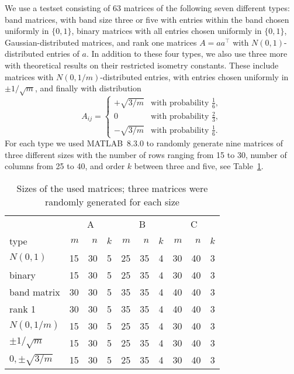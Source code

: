 \documentclass[journal]{IEEEtran}
\newcommand{\T}{^{\top}}
\begin{document}
We use a testset consisting of 63 matrices of the following seven
different types: band matrices,
with band size three or five with entries within the band chosen uniformly in $\{0,1\}$, binary matrices with all entries chosen 
uniformly in $\{0,1\}$, Gaussian-distributed matrices, and rank one 
matrices $A = aa\T$ with $N(0,1)$-distributed entries of $a$. In addition to these four types,
we also use three more with theoretical results on their restricted isometry
constants. These include matrices with 
$N(0, 1/m)$-distributed entries, with entries chosen uniformly in $\pm 1/\sqrt{m}$, and finally with distribution
\begin{equation}\nonumber
  A_{ij} = \begin{cases}
    + \sqrt{3/m} & \text{with probability } \frac{1}{6}, \\
    0 & \text{with probability } \frac{2}{3}, \\
    - \sqrt{3/m} & \text{with probability } \frac{1}{6}.
  \end{cases}
\end{equation}
For each type we used \mbox{MATLAB 8.3.0} to randomly generate nine
matrices of three different sizes with the number of rows ranging from 15
to 30, number of columns
from 25 to 40, and order $k$ between three and five, see Table~\ref{matrixsizes}.

\begin{table} 
 \begin{scriptsize} \caption{Sizes of the used matrices; three matrices were
 randomly generated for each size} 
 \label{matrixsizes} 
 \begin{tabular*}{\linewidth}{@{}l@{\;\;\extracolsep{\fill}}rrrrrrrrr@{}}\toprule 
  & \multicolumn{3}{c}{A} & \multicolumn{3}{c}{B} & \multicolumn{3}{c}{C} \\ 
\cmidrule(r){2-4} \cmidrule{5-7}  \cmidrule(l){8-10}
type & $m$ & $n$ & $k$ & $m$ & $n$ & $k$ & $m$ & $n$ & $k$  \\ 
\midrule 
$N(0,1)$ & 15 & 30 & 5 & 25 & 35 & 4 & 30 & 40 & 3 \\
binary & 15 & 30 & 5 & 25 & 35 & 4 & 30 & 40 & 3 \\
band matrix & 30 & 30 & 5 & 35 & 35 & 4 & 40 & 40 & 3 \\
rank 1& 30 & 30 & 5 & 35 & 35 & 4 & 40 & 40 & 3 \\
$N(0,1/m)$ & 15 & 30 & 5 & 25 & 35 & 4 & 30 & 40 & 3 \\
$\pm 1/\sqrt{m}$ & 15 & 30 & 5 & 25 & 35 & 4 & 30 & 40 & 3 \\
$0, \pm \sqrt{3/m}$ & 15 & 30 & 5 & 25 & 35 & 4 & 30 & 40 & 3 \\
\bottomrule 
 \end{tabular*} 
 \end{scriptsize} 
 \end{table} 
\end{document}
